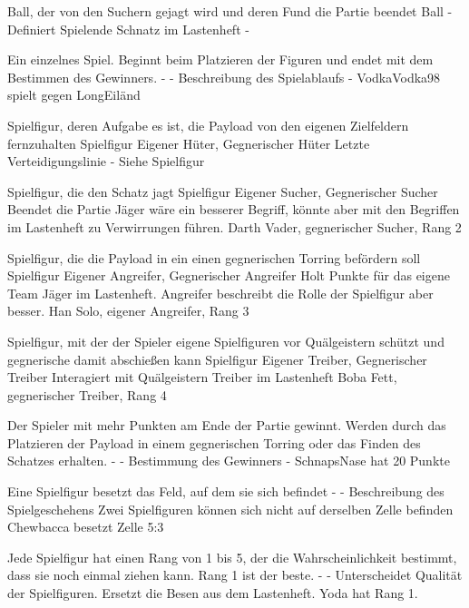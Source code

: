 {Ball, der von den Suchern gejagt wird und deren Fund die Partie beendet}
{Ball}
{-}
{Definiert Spielende}
{\glqq{} Schnatz\grqq{}  im Lastenheft}
{-}

{Ein einzelnes Spiel. Beginnt beim Platzieren der Figuren und endet mit dem Bestimmen des Gewinners.}
{-}
{-}
{Beschreibung des Spielablaufs}
{-}
{VodkaVodka98 spielt gegen LongEiländ}

{Spielfigur, deren Aufgabe es ist, die Payload von den eigenen Zielfeldern fernzuhalten}
{Spielfigur}
{Eigener Hüter, Gegnerischer Hüter}
{Letzte Verteidigungslinie}
{-}
{Siehe \glqq{}Spielfigur\grqq{} }

{Spielfigur, die den Schatz jagt}
{Spielfigur}
{Eigener Sucher, Gegnerischer Sucher}
{Beendet die Partie}
{\glqq{}Jäger\grqq{}  wäre ein besserer Begriff, könnte aber mit den Begriffen im Lastenheft zu Verwirrungen führen.}
{Darth Vader, gegnerischer Sucher, Rang 2}

{Spielfigur, die die Payload in ein einen gegnerischen Torring befördern soll}
{Spielfigur}
{Eigener Angreifer, Gegnerischer Angreifer}
{Holt Punkte für das eigene Team}
{\glqq{}Jäger\grqq{}  im Lastenheft. Angreifer beschreibt die Rolle der Spielfigur aber besser.}
{Han Solo, eigener Angreifer, Rang 3}

{Spielfigur, mit der der Spieler eigene Spielfiguren vor Quälgeistern schützt und gegnerische damit abschießen kann}
{Spielfigur}
{Eigener Treiber, Gegnerischer Treiber}
{Interagiert mit Quälgeistern}
{\glqq{}Treiber\grqq{}  im Lastenheft}
{Boba Fett, gegnerischer Treiber, Rang 4}

{Der Spieler mit mehr Punkten am Ende der Partie gewinnt. Werden durch das Platzieren der Payload in einem gegnerischen Torring oder das Finden des Schatzes erhalten.}
{-}
{-}
{Bestimmung des Gewinners}
{-}
{SchnapsNase hat 20 Punkte}

{Eine Spielfigur besetzt das Feld, auf dem sie sich befindet}
{-}
{-}
{Beschreibung des Spielgeschehens}
{Zwei Spielfiguren können sich nicht auf derselben Zelle befinden}
{Chewbacca besetzt Zelle 5:3}

{Jede Spielfigur hat einen Rang von 1 bis 5, der die Wahrscheinlichkeit bestimmt, dass sie noch einmal ziehen kann. Rang 1 ist der beste.}
{-}
{-}
{Unterscheidet Qualität der Spielfiguren.}
{Ersetzt die \glqq{}Besen\grqq{}  aus dem Lastenheft.}
{Yoda hat Rang 1.}

